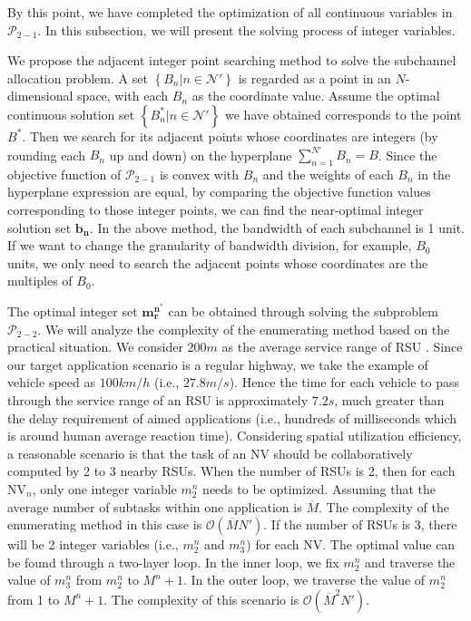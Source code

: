 \documentclass[lettersize,journal]{IEEEtran}
\begin{document}
By this point, we have completed the optimization of all continuous variables in $\mathcal{P}_{2-1}$. In this subsection, we will present the solving process of integer variables.

We propose the adjacent integer point searching method to solve the subchannel allocation problem. A set $\left\{B_n| n \in \mathcal{N'}\right\}$ is regarded as a point in an $N$-dimensional space, with each $B_n$ as the coordinate value. Assume the optimal continuous solution set $\left\{B^*_n| n \in \mathcal{N'}\right\}$ we have obtained corresponds to the point $B^*$. Then we search for its adjacent points whose coordinates are integers (by rounding each $B_n$ up and down) on the hyperplane $\sum_{n=1}^{N'} B_n = B$. Since the objective function of $\mathcal{P}_{2-1}$ is convex with $B_n$ and the weights of each $B_n$ in the hyperplane expression are equal, by comparing the objective function values corresponding to those integer points, we can find the near-optimal integer solution set $\mathbf{b_n}$. In the above method, the bandwidth of each subchannel is 1 unit. If we want to change the granularity of bandwidth division, for example, $B_0$ units, we only need to search the adjacent points whose coordinates are the multiples of $B_0$.


The optimal integer set $\mathbf{m^{n^*}_r}$ can be obtained through solving the subproblem $\mathcal{P}_{2-2}$. We will analyze the complexity of the enumerating method based on the practical situation. We consider $200 m$ as the average service range of RSU \cite{ref31}. Since our target application scenario is a regular highway, we take the example of vehicle speed as $100 km/h$ (i.e., $27.8 m/s$). Hence the time for each vehicle to pass through the service range of an RSU is approximately $7.2 s$, much greater than the delay requirement of aimed applications (i.e., hundreds of milliseconds which is around human average reaction time). Considering spatial utilization efficiency, a reasonable scenario is that the task of an NV should be collaboratively computed by 2 to 3 nearby RSUs. When the number of RSUs is 2, then for each NV$_n$, only one integer variable $m^n_2$ needs to be optimized. Assuming that the average number of subtasks within one application is $\overline{M}$. The complexity of the enumerating method in this case is $\mathcal{O}\left( \overline{M} N' \right)$. If the number of RSUs is 3, there will be 2 integer variables (i.e., $m^n_2$ and $m^n_3$) for each NV. The optimal value can be found through a two-layer loop. In the inner loop, we fix $m^n_2$ and traverse the value of $m^n_3$ from $m^n_2$ to $M^n+1$. In the outer loop, we traverse the value of $m^n_2$ from 1 to $M^n+1$. The complexity of this scenario is $\mathcal{O}\left( \overline{M}^2 N' \right)$.
\end{document}
